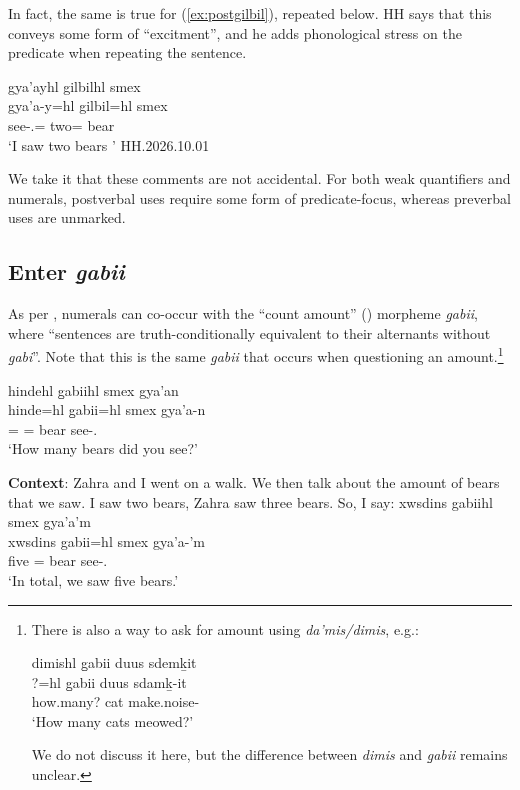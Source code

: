 \documentclass{article}
\begin{document}
In fact, the same is true for (\ref{ex:postgilbil}), repeated below. HH says that this conveys some form of ``excitment'', and he adds phonological stress on the predicate when repeating the sentence.


\begin{exe}
    \ex \glll gya'ayhl gilbilhl smex \\
    gya'a-y=hl gilbil=hl smex \\
    see-\Fsg{}.\Ii{}=\Cn{} two=\Cn{} bear \\
    `I saw two bears ' \hfill  HH.2026.10.01\\
\end{exe}

We take it that these comments are not accidental. For both weak quantifiers and numerals, postverbal uses require some form of predicate-focus, whereas preverbal uses are unmarked.



\subsection{Enter \textit{g̱abii}} 
As per \textcite[310]{bicevskisQuantificationGitksan2017}, numerals can co-occur with the ``count amount'' (\Cnt{})  morpheme \textit{g̱abii}, where ``sentences are truth-conditionally equivalent to their alternants without
\textit{g̱abi}''. Note that this is the same \textit{g̱abii} that occurs when questioning an amount.\footnote{There is also a way to ask for amount using \textit{da'mis/dimis}, e.g.: 
\begin{exe}
    \ex \glll dimishl g̱abii duus sdemḵit \\
    ?=hl g̱abii duus sdamḵ-it \\
    how.many? \Cnt{} cat make.noise-\Sx \\
    `How many cats meowed?' 
\end{exe}
We do not discuss it here, but the difference between \textit{dimis} and \textit{g̱abii} remains unclear.}

\begin{exe}
    \ex \glll hindehl g̱abiihl smex gya'an \\
    hinde=hl g̱abii=hl smex gya'a-n \\
    \Wh{}=\Cn{} \Cnt{}=\Cn{} bear see-\Ssg{}.\Ii{} \\
    `How many bears did you see?'
\end{exe}

\begin{exe}
    \ex \textbf{Context}: Zahra and I went on a walk. We then talk about the amount of bears that we saw. I saw two bears, Zahra saw three bears. So, I say:
    \glll
    xwsdins gabiihl smex gya’a’m \\
    xwsdins gabii=hl smex gya’a-’m \\
    five \Cnt=\Cn{} bear see-\Fpl.\Ii \\
    \glt `In total, we saw five bears.'
\end{exe}
\end{document}
